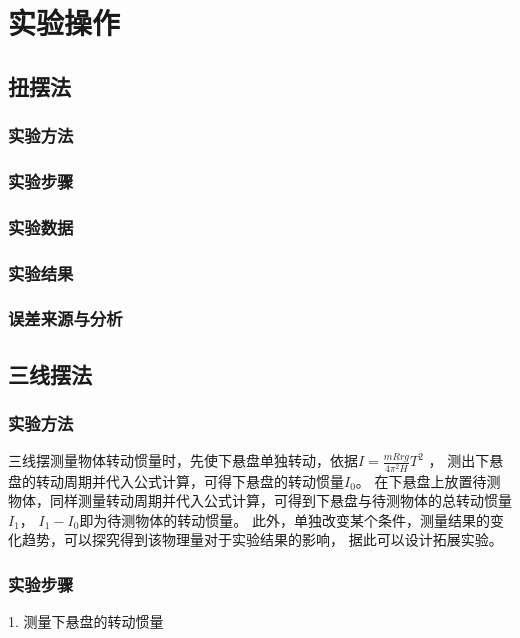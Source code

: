 \documentclass[12pt,hyperref,a4paper,UTF8]{ctexart}
\begin{document}
\section{实验操作}
\subsection{扭摆法}
\subsubsection{实验方法}

\subsubsection{实验步骤}

\subsubsection{实验数据}

\subsubsection{实验结果}

\subsubsection{误差来源与分析}

\subsection{三线摆法}
\subsubsection{实验方法}

三线摆测量物体转动惯量时，先使下悬盘单独转动，依据$ I = \frac{mRrg}{4 {\pi}^2 H} T^2 $ ，
测出下悬盘的转动周期并代入公式计算，可得下悬盘的转动惯量$I_0$。
在下悬盘上放置待测物体，同样测量转动周期并代入公式计算，可得到下悬盘与待测物体的总转动惯量$I_1$，
$I_1-I_0$即为待测物体的转动惯量。
此外，单独改变某个条件，测量结果的变化趋势，可以探究得到该物理量对于实验结果的影响，
据此可以设计拓展实验。

\subsubsection{实验步骤}

1. 测量下悬盘的转动惯量
\end{document}
